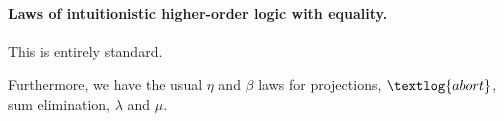 \judgment{\vctx \mid \prop \proves \propB}
\paragraph{Laws of intuitionistic higher-order logic with equality.}
This is entirely standard.
Furthermore, we have the usual $\eta$ and $\beta$ laws for projections, $\textlog{abort}$, sum elimination, $\lambda$ and $\mu$.


